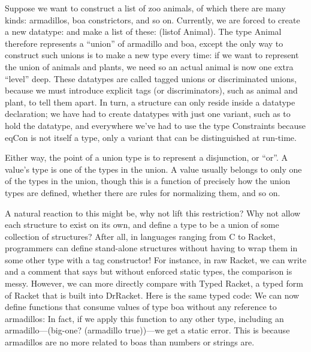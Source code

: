 
Suppose we want to construct a list of zoo animals, of which there are many
kinds: armadillos, boa constrictors, and so on. Currently, we are forced to
create a new datatype:
and make a list of these: (listof Animal). The type Animal therefore represents
a “union” of armadillo and boa, except the only way to construct such unions is
to make a new type every time: if we want to represent the union of animals and
plants, we need
so an actual animal is now one extra “level” deep. These datatypes are called
tagged unions or discriminated unions, because we must introduce explicit tags
(or discriminators), such as animal and plant, to tell them apart. In turn, a
structure can only reside inside a datatype declaration; we have had to create
datatypes with just one variant, such as
to hold the datatype, and everywhere we’ve had to use the type Constraints
because eqCon is not itself a type, only a variant that can be distinguished at
run-time.

Either way, the point of a union type is to represent a disjunction, or “or”. A
value’s type is one of the types in the union. A value usually belongs to only
one of the types in the union, though this is a function of precisely how the
union types are defined, whether there are rules for normalizing them, and so
on.

\secdown


A natural reaction to this might be, why not lift this restriction? Why not
allow each structure to exist on its own, and define a type to be a union of
some collection of structures? After all, in languages ranging from C to Racket,
programmers can define stand-alone structures without having to wrap them in
some other type with a tag constructor! For instance, in raw Racket, we can
write
and a comment that says
but without enforced static types, the comparison is messy. However, we can more
directly compare with Typed Racket, a typed form of Racket that is built into
DrRacket. Here is the same typed code:
We can now define functions that consume values of type boa without any
reference to armadillos:
In fact, if we apply this function to any other type, including an
armadillo—(big-one? (armadillo true))—we get a static error. This is because
armadillos are no more related to boas than numbers or strings are.

